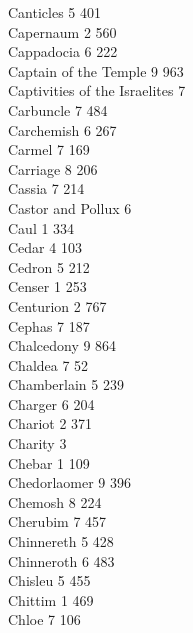 Canticles \hfill 5 \quad \phantom{0}401\\
Capernaum \hfill 2 \quad \phantom{0}560\\
Cappadocia \hfill 6 \quad \phantom{0}222\\
Captain of the Temple \hfill 9 \quad \phantom{0}963\\
Captivities of the Israelites \hfill 7 \\
Carbuncle \hfill 7 \quad \phantom{0}484\\
Carchemish \hfill 6 \quad \phantom{0}267\\
Carmel \hfill 7 \quad \phantom{0}169\\
Carriage \hfill 8 \quad \phantom{0}206\\
Cassia \hfill 7 \quad \phantom{0}214\\
Castor and Pollux \hfill 6 \\
Caul \hfill 1 \quad \phantom{0}334\\
Cedar \hfill 4 \quad \phantom{0}103\\
Cedron \hfill 5 \quad \phantom{0}212\\
Censer \hfill 1 \quad \phantom{0}253\\
Centurion \hfill 2 \quad \phantom{0}767\\
Cephas \hfill 7 \quad \phantom{0}187\\
Chalcedony \hfill 9 \quad \phantom{0}864\\
Chaldea \hfill 7 \quad \phantom{0}\phantom{0}52\\
Chamberlain \hfill 5 \quad \phantom{0}239\\
Charger \hfill 6 \quad \phantom{0}204\\
Chariot \hfill 2 \quad \phantom{0}371\\
Charity \hfill 3 \\
Chebar \hfill 1 \quad \phantom{0}109\\
Chedorlaomer \hfill 9 \quad \phantom{0}396\\
Chemosh \hfill 8 \quad \phantom{0}224\\
Cherubim \hfill 7 \quad \phantom{0}457\\
Chinnereth \hfill 5 \quad \phantom{0}428\\
Chinneroth \hfill 6 \quad \phantom{0}483\\
Chisleu \hfill 5 \quad \phantom{0}455\\
Chittim \hfill 1 \quad \phantom{0}469\\
Chloe \hfill 7 \quad \phantom{0}106\\
